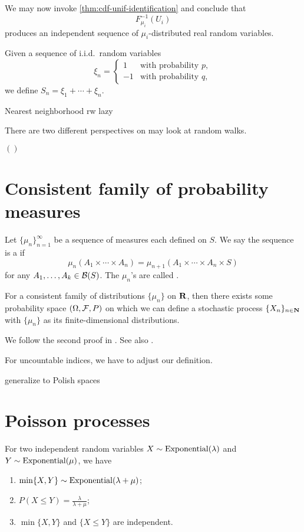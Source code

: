 \documentclass[10pt]{book}
\begin{document}
We may now invoke \cref{thm:cdf-unif-identification} and conclude that \[
    F_{\mu_i}^{-1}(U_i)
\] produces an independent sequence of $\mu_i$-distributed real random variables.

Given a sequence of i.i.d.\ random variables \[\xi_n = \begin{cases}
    1 & \text{with probability }p,\\
    -1 & \text{with probability }q,
\end{cases}\] we define $S_n = \xi_1 + \dotsb+\xi_n$. 

Nearest neighborhood rw 
lazy

There are two different perspectives on may look at random walks.

$()$


\section{Consistent family of probability measures} \label{sec:consistent-family}

Let $\{\mu_n\}_{n=1}^\infty$ be a sequence of measures each defined on $S$. We say the sequence is a  if \[
    \mu_n(A_1\times \dotsb \times A_n) = \mu_{n+1}(A_1\times \dotsb \times A_n \times S)
\] for any $A_1,\dotsc,A_k \in \mathcal{B}(S)$. The $\mu_n$'s are called .

\begin{namedthm} \label{thm:KET}
    For a consistent family of distributions $\{\mu_n\}$ on $\mathbf{R}$, then there exists some probability space $(\Omega,\mathcal{F},P)$ on which we can define a stochastic process $\{X_n\}_{n\in \mathbf{N}}$ with $\{\mu_n\}$ as its finite-dimensional distributions.
\end{namedthm}

We follow the second proof in \cite[Section~36]{Billingsley_1995}. See also \cite[Chapter~8]{Kallenberg_2002}.

For uncountable indices, we have to adjust our definition.

generalize to Polish spaces 








\section{Poisson processes}
\begin{prop}
    For two independent random variables $X\sim \operatorname{Exponential}(\lambda)$ and $Y\sim \operatorname{Exponential}(\mu)$, we have \begin{enumerate}
        \item \label{enu:2-Poisson-clocks-a} $\min\{X,Y\} \sim \operatorname{Exponential}(\lambda + \mu)$;
        \item \label{enu:2-Poisson-clocks-b} $P(X \leq Y) = \frac{\lambda}{\lambda + \mu}$;
        \item \label{enu:2-Poisson-clocks-c} $\min\{X,Y\}$ and $\{X\leq Y\}$ are independent.
    \end{enumerate}
\end{prop}
\end{document}
